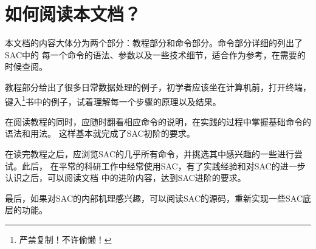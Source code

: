 \section{如何阅读本文档？}

本文档的内容大体分为两个部分：教程部分和命令部分。命令部分详细的列出了SAC中的
每一个命令的语法、参数以及一些技术细节，适合作为参考，在需要的时候查阅。

教程部分给出了很多日常数据处理的例子，初学者应该坐在计算机前，打开终端，
键入\footnote{严禁复制！不许偷懒！}书中的例子，试着理解每一个步骤的原理以及结果。

在阅读教程的同时，应随时翻看相应命令的说明，在实践的过程中掌握基础命令的语法和用法。
这样基本就完成了SAC初阶的要求。

在读完教程之后，应浏览SAC的几乎所有命令，并挑选其中感兴趣的一些进行尝试。此后，
在平常的科研工作中经常使用SAC，有了实践经验和对SAC的进一步认识之后，可以阅读文档
中的进阶内容，达到SAC进阶的要求。

最后，如果对SAC的内部机理感兴趣，可以阅读SAC的源码，重新实现一些SAC底层的功能。
